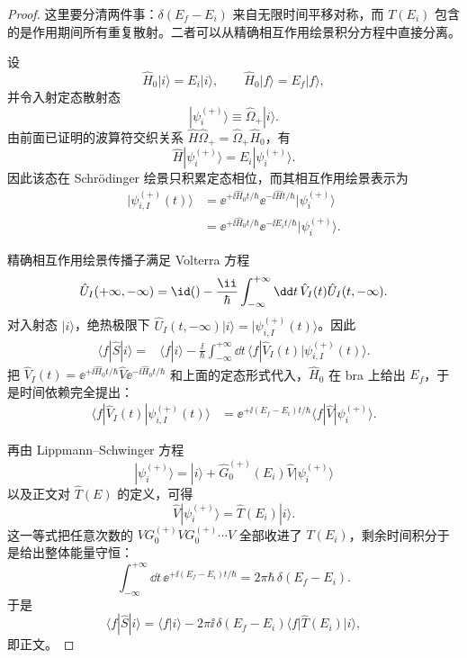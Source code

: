 \begin{proof}
这里要分清两件事：\(\delta(E_f-E_i)\) 来自无限时间平移对称，而 \(T(E_i)\) 包含的是作用期间所有重复散射。二者可以从精确相互作用绘景积分方程中直接分离。

设
\begin{equation*}
\hat H_0|i\rangle=E_i|i\rangle,
\qquad
\hat H_0|f\rangle=E_f|f\rangle,
\end{equation*}
并令入射定态散射态
\begin{equation*}
|\psi_i^{(+)}\rangle
\equiv\hat\Omega_+|i\rangle.
\end{equation*}
由前面已证明的波算符交织关系
\(\hat H\hat\Omega_+=\hat\Omega_+\hat H_0\)，有
\begin{equation*}
\hat H|\psi_i^{(+)}\rangle
=E_i|\psi_i^{(+)}\rangle.
\end{equation*}
因此该态在 Schr\"odinger 绘景只积累定态相位，而其相互作用绘景表示为
\begin{align*}
|\psi_{i,I}^{(+)}(t)\rangle
&=\ee^{+\ii\hat H_0t/\hbar}
\ee^{-\ii\hat Ht/\hbar}|\psi_i^{(+)}\rangle\\
&=\ee^{+\ii\hat H_0t/\hbar}
\ee^{-\ii E_it/\hbar}|\psi_i^{(+)}\rangle.
\end{align*}

精确相互作用绘景传播子满足 Volterra 方程
\begin{equation*}
\hat U_I(+\infty,-\infty)
=\id()-\frac{\ii}{\hbar}
\int_{-\infty}^{+\infty}\dd t\,
\hat V_I(t)\hat U_I(t,-\infty).
\end{equation*}
对入射态 \(|i\rangle\)，绝热极限下
\(\hat U_I(t,-\infty)|i\rangle=|\psi_{i,I}^{(+)}(t)\rangle\)。因此
\begin{align*}
\langle f|\hat S|i\rangle
={}&\langle f|i\rangle
-\frac{\ii}{\hbar}
\int_{-\infty}^{+\infty}\dd t\,
\langle f|\hat V_I(t)|\psi_{i,I}^{(+)}(t)\rangle.
\end{align*}
把
\(\hat V_I(t)=\ee^{+\ii\hat H_0t/\hbar}\hat V\ee^{-\ii\hat H_0t/\hbar}\)
和上面的定态形式代入，\(\hat H_0\) 在 bra 上给出 \(E_f\)，于是时间依赖完全提出：
\begin{align*}
\langle f|\hat V_I(t)|\psi_{i,I}^{(+)}(t)\rangle
&=\ee^{+\ii(E_f-E_i)t/\hbar}
\langle f|\hat V|\psi_i^{(+)}\rangle.
\end{align*}

再由 Lippmann--Schwinger 方程
\begin{equation*}
|\psi_i^{(+)}\rangle
=|i\rangle+\hat G_0^{(+)}(E_i)\hat V|\psi_i^{(+)}\rangle
\end{equation*}
以及正文对 \(\hat T(E)\) 的定义，可得
\begin{equation*}
\hat V|\psi_i^{(+)}\rangle
=\hat T(E_i)|i\rangle.
\end{equation*}
这一等式把任意次数的
\(V G_0^{(+)}V G_0^{(+)}\cdots V\)
全部收进了 \(T(E_i)\)，剩余时间积分于是给出整体能量守恒：
\begin{equation*}
\int_{-\infty}^{+\infty}\dd t\,
\ee^{+\ii(E_f-E_i)t/\hbar}
=2\pi\hbar\,\delta(E_f-E_i).
\end{equation*}
于是
\begin{equation*}
\langle f|\hat S|i\rangle
=\langle f|i\rangle
-2\pi\ii\,\delta(E_f-E_i)
\langle f|\hat T(E_i)|i\rangle,
\end{equation*}
即正文。


\end{proof}
